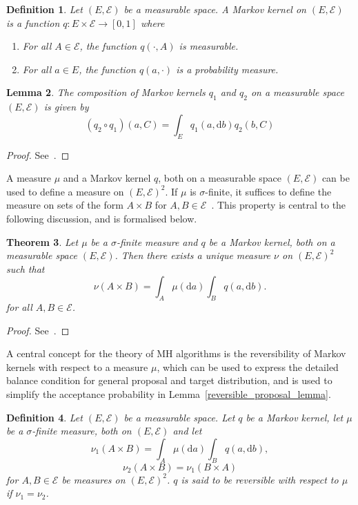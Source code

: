 \documentclass[english,twoside,openright]{HYgraduMLDS}
\newtheorem{lemma}{Lemma}[chapter]
\newtheorem{theorem}[lemma]{Theorem}
\newtheorem{definition}[lemma]{Definition}
\newcommand{\dx}{\mathrm{d}}
\begin{document}
\begin{definition}
	Let \((E, \mathcal{E})\) be a measurable space. A Markov kernel on
  \((E, \mathcal{E})\) is a function \(q\colon E\times \mathcal{E}\to [0, 1]\)
  where
  \begin{enumerate}
    \item For all \(A\in \mathcal{E}\), the function \(q(\cdot, A)\) is
          measurable.
    \item
          For all \(a\in E\), the function \(q(a, \cdot)\) is a probability
          measure.
  \end{enumerate}
\end{definition}

\begin{lemma}\label{markov_kernel_composition_lemma}
	The composition of Markov kernels \(q_{1}\) and \(q_{2}\) on a measurable space
  \((E, \mathcal{E})\) is given by
  \[
    (q_{2}\circ q_{1})(a, C) = \int_{E}q_{1}(a, \dx b)q_{2}(b, C)
  \]
\end{lemma}
\begin{proof}
	See~\cite[Equation 6.5]{Cin11}.
\end{proof}

A measure \(\mu\) and a Markov kernel \(q\), both on a measurable space
\((E, \mathcal{E})\) can be used to define a measure on
\((E, \mathcal{E})^{2}\). If \(\mu\) is \(\sigma\)-finite, it suffices to
define the measure on sets of the form \(A\times B\) for
\(A, B\in \mathcal{E}\)~\cite{Cin11}.
This property is central to the following discussion, and is formalised below.

\begin{theorem}\label{product_measure_theorem}
	Let \(\mu\) be a \(\sigma\)-finite measure and \(q\) be a Markov kernel,
  both on a measurable space \((E, \mathcal{E})\). Then there exists a
  unique measure \(\nu\) on \((E, \mathcal{E})^{2}\) such that
  \[
    \nu(A\times B) = \int_{A}\mu(\dx a)\int_{B}q(a, \dx b).
  \]
  for all \(A, B \in \mathcal{E}\).
\end{theorem}
\begin{proof}
	See~\cite[Theorem 6.11]{Cin11}.
\end{proof}

A central concept for the theory of MH algorithms is the reversibility of
Markov kernels with respect to a measure \(\mu\), which can be used
to express the detailed balance condition for general proposal and target
distribution, and is used to simplify the acceptance probability in
Lemma~\ref{reversible_proposal_lemma}.
\begin{definition}\label{reversible_definition}
	Let \((E, \mathcal{E})\) be a measurable space. Let \(q\) be a Markov kernel,
  let \(\mu\) be a \(\sigma\)-finite measure, both on \((E, \mathcal{E})\) and
  let
  \[
    \nu_{1}(A\times B) = \int_{A}\mu(\dx a)\int_{B}q(a, \dx b),
  \]
  \[
    \nu_{2}(A\times B) = \nu_{1}(B\times A)
  \]
  for \(A, B\in \mathcal{E}\) be measures on \((E, \mathcal{E})^{2}\).
  \(q\) is said to be reversible with respect to \(\mu\) if
  \(\nu_{1} = \nu_{2}\).
\end{definition}
\end{document}
